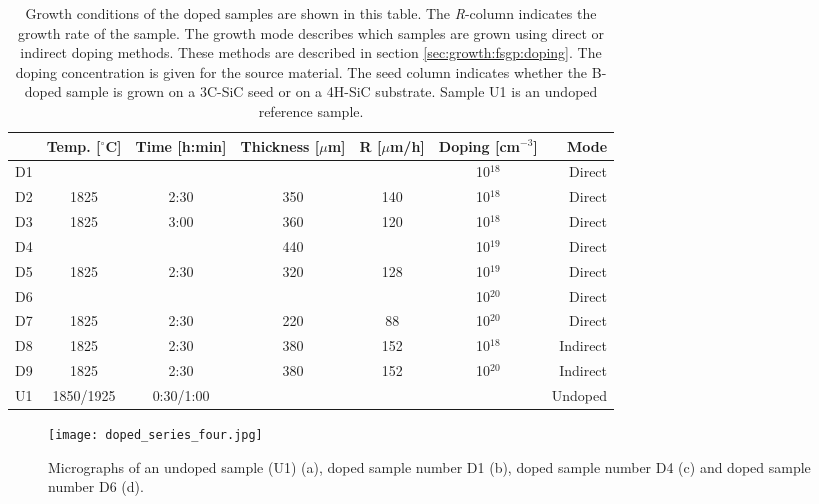 \begin{table}[h]
\small
\caption{Growth conditions of the doped samples are shown in this table. The \emph{R}-column indicates the growth rate of the sample. The growth mode describes which samples are grown using direct or indirect doping methods. These methods are described in section \ref{sec:growth:fsgp:doping}. The doping concentration is given for the source material. The seed column indicates whether the B-doped sample is grown on a 3C-SiC seed or on a 4H-SiC substrate. Sample U1 is an undoped reference sample.} 
\label{tab:doped_samples}
\begin{center}
\begin{tabular}{l c c c c c r}
  \hline                       
  \hline       
  \vspace{1mm}
   & \small{Temp. [$^\circ$C]} & \small{Time [h:min]} & \small{Thickness [$\mu$m]} &R [$\mu$m/h] & \small{Doping [cm$^{-3}$]} & Mode\\
    \hline
  D1 &  &  &  & & 10$^{18}$&Direct \\ %
  D2 & 1825 & 2:30 & 350 & 140 & 10$^{18}$&Direct \\ %
  D3 & 1825 & 3:00 & 360 & 120 &10$^{18}$&Direct \\	%
  D4 &  &  & 440 & & 10$^{19}$&Direct \\ %
  D5 & 1825 & 2:30 & 320 & 128 &10$^{19}$&Direct \\ %
  D6 &  &  &  & & 10$^{20}$&Direct \\%
  D7 & 1825 & 2:30 & 220 & 88 &10$^{20}$&Direct \\%
  D8 & 1825 & 2:30 & 380 & 152 & 10$^{18}$&Indirect \\%
  D9 & 1825 & 2:30 & 380 & 152 &10$^{20}$&Indirect \\%
  U1 & 1850/1925  & 0:30/1:00 & & & & Undoped\\
  
  \hline  
\end{tabular}
\end{center}
\end{table}


\begin{figure}[h]
\begin{center}
\texttt{[image: doped\_series\_four.jpg]}
\caption{Micrographs of an undoped sample (U1) (a), doped sample number D1 (b), doped sample number D4 (c) and doped sample number D6 (d).
\label{fig:B_doped_micrographs1}}
\end{center}
\end{figure}

